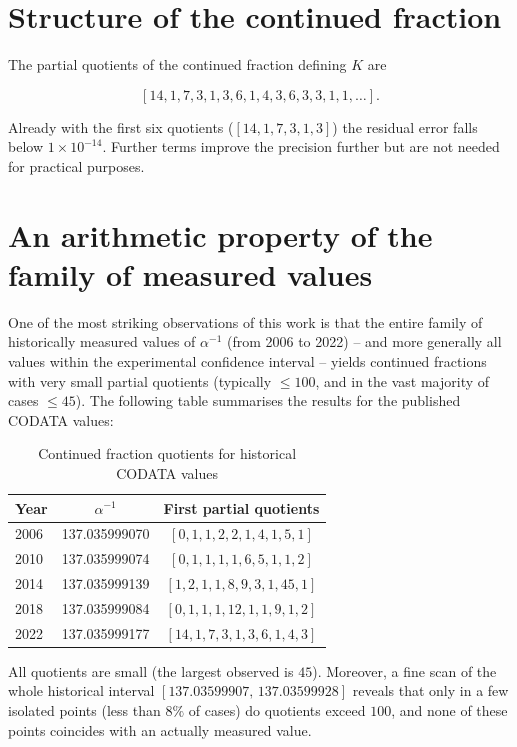 \documentclass[12pt]{article}
\begin{document}
\section{Structure of the continued fraction}

The partial quotients of the continued fraction defining $K$ are

\[
[14, 1, 7, 3, 1, 3, 6, 1, 4, 3, 6, 3, 3, 1, 1, \dots].
\]

Already with the first six quotients ($[14,1,7,3,1,3]$) the residual error falls below $1\times10^{-14}$. Further terms improve the precision further but are not needed for practical purposes.

\section{An arithmetic property of the family of measured values}

One of the most striking observations of this work is that the entire family of historically measured values of $\alpha^{-1}$ (from 2006 to 2022) – and more generally all values within the experimental confidence interval – yields continued fractions with very small partial quotients (typically $\le 100$, and in the vast majority of cases $\le 45$). The following table summarises the results for the published CODATA values:

\begin{table}[h]
\centering
\caption{Continued fraction quotients for historical CODATA values}
\label{tab:historical}
\begin{tabular}{lcc}
\toprule
Year & $\alpha^{-1}$ & First partial quotients \\
\midrule
2006 & 137.035999070 & $[0, 1, 1, 2, 2, 1, 4, 1, 5, 1]$ \\
2010 & 137.035999074 & $[0, 1, 1, 1, 1, 6, 5, 1, 1, 2]$ \\
2014 & 137.035999139 & $[1, 2, 1, 1, 8, 9, 3, 1, 45, 1]$ \\
2018 & 137.035999084 & $[0, 1, 1, 1, 12, 1, 1, 9, 1, 2]$ \\
2022 & 137.035999177 & $[14, 1, 7, 3, 1, 3, 6, 1, 4, 3]$ \\
\bottomrule
\end{tabular}
\end{table}

All quotients are small (the largest observed is $45$). Moreover, a fine scan of the whole historical interval $[137.03599907,\,137.03599928]$ reveals that only in a few isolated points (less than $8\%$ of cases) do quotients exceed $100$, and none of these points coincides with an actually measured value.
\end{document}
